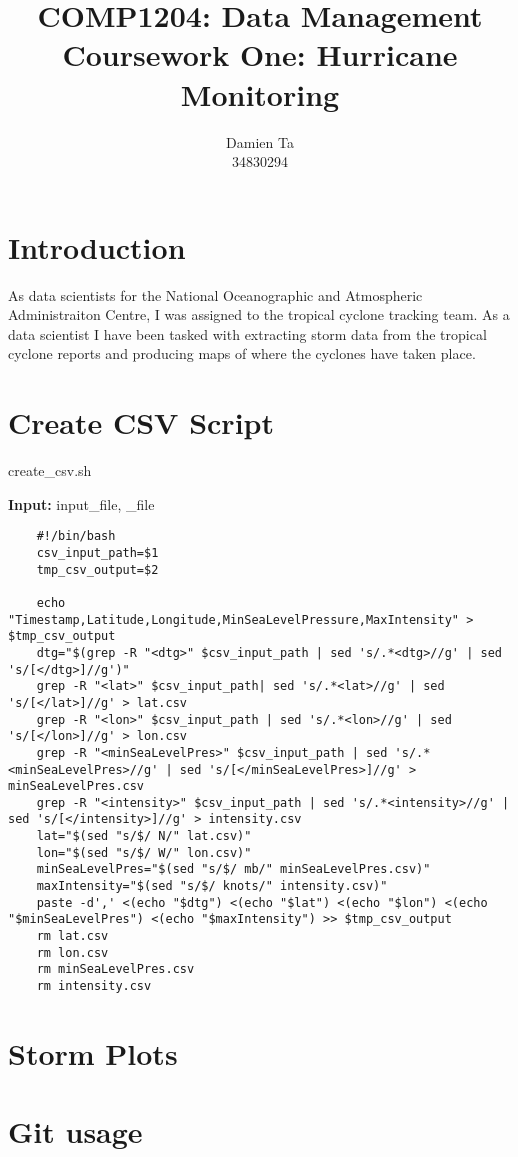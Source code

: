 \documentclass[]{article}
\title{COMP1204: Data Management \\ Coursework One: Hurricane Monitoring }
\author{Damien Ta \\ 34830294}
\begin{document}
\maketitle

\section{Introduction}
As data scientists for the National Oceanographic and Atmospheric Administraiton Centre, I was assigned to the tropical cyclone
tracking team. As a data scientist I have been tasked with extracting storm data from the tropical cyclone reports and producing
maps of where the cyclones have taken place.
\section{Create CSV Script}
\begin{algorithm}
    \caption{create\_csv.sh}
    \begin{algorithmic}
        \STATE \textbf{Input:} input\_file, \_file
    \end{algorithmic}
\end{algorithm}

\begin{verbatim}
    #!/bin/bash
    csv_input_path=$1
    tmp_csv_output=$2
    
    echo "Timestamp,Latitude,Longitude,MinSeaLevelPressure,MaxIntensity" > $tmp_csv_output
    dtg="$(grep -R "<dtg>" $csv_input_path | sed 's/.*<dtg>//g' | sed 's/[</dtg>]//g')"
    grep -R "<lat>" $csv_input_path| sed 's/.*<lat>//g' | sed 's/[</lat>]//g' > lat.csv
    grep -R "<lon>" $csv_input_path | sed 's/.*<lon>//g' | sed 's/[</lon>]//g' > lon.csv
    grep -R "<minSeaLevelPres>" $csv_input_path | sed 's/.*<minSeaLevelPres>//g' | sed 's/[</minSeaLevelPres>]//g' > minSeaLevelPres.csv
    grep -R "<intensity>" $csv_input_path | sed 's/.*<intensity>//g' | sed 's/[</intensity>]//g' > intensity.csv
    lat="$(sed "s/$/ N/" lat.csv)"
    lon="$(sed "s/$/ W/" lon.csv)"
    minSeaLevelPres="$(sed "s/$/ mb/" minSeaLevelPres.csv)"
    maxIntensity="$(sed "s/$/ knots/" intensity.csv)"
    paste -d',' <(echo "$dtg") <(echo "$lat") <(echo "$lon") <(echo "$minSeaLevelPres") <(echo "$maxIntensity") >> $tmp_csv_output
    rm lat.csv
    rm lon.csv
    rm minSeaLevelPres.csv
    rm intensity.csv
\end{verbatim}
\section{Storm Plots}

\section{Git usage}
\end{document}

